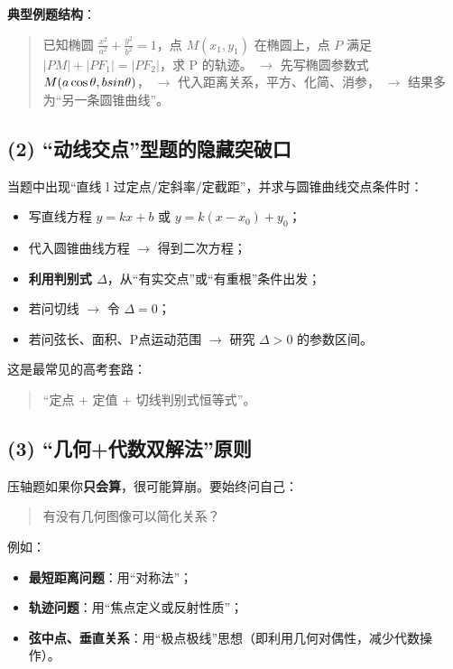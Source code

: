 \documentclass{ctexart}
\begin{document}
	\textbf{典型例题结构}：
	
	\begin{quote}
		已知椭圆 $\frac{x^2}{a^2}+\frac{y^2}{b^2}=1$，点 $M(x_1,y_1)$ 在椭圆上，点 $P$ 满足 $|PM|+|PF_1|=|PF_2|$，求 P 的轨迹。
		\newline$\rightarrow$ 先写椭圆参数式 $M(a\cos\theta,b\\sin\theta)$，
		\newline$\rightarrow$ 代入距离关系，平方、化简、消参，
		\newline$\rightarrow$ 结果多为``另一条圆锥曲线''。
	\end{quote}
	
	\subsection*{(2) ``动线交点''型题的隐藏突破口}
	
	当题中出现``直线 l 过定点/定斜率/定截距''，并求与圆锥曲线交点条件时：
	
	\begin{itemize}
		\item 写直线方程 $y=kx+b$ 或 $y=k(x-x_0)+y_0$；
		\item 代入圆锥曲线方程 $\rightarrow$ 得到二次方程；
		\item \textbf{利用判别式 $\Delta$}，从``有实交点''或``有重根''条件出发；
		\item 若问切线 $\rightarrow$ 令 $\Delta = 0$；
		\item 若问弦长、面积、P点运动范围 $\rightarrow$ 研究 $\Delta>0$ 的参数区间。
	\end{itemize}
	
	这是最常见的高考套路：
	
	\begin{quote}
		``定点 + 定值 + 切线判别式恒等式''。
	\end{quote}
	
	\subsection*{(3) ``几何+代数双解法''原则}
	
	压轴题如果你\textbf{只会算}，很可能算崩。要始终问自己：
	
	\begin{quote}
		有没有几何图像可以简化关系？
	\end{quote}
	
	例如：
	
	\begin{itemize}
		\item \textbf{最短距离问题}：用``对称法''；
		\item \textbf{轨迹问题}：用``焦点定义或反射性质''；
		\item \textbf{弦中点、垂直关系}：用``极点极线''思想（即利用几何对偶性，减少代数操作）。
	\end{itemize}
	
\end{document}
